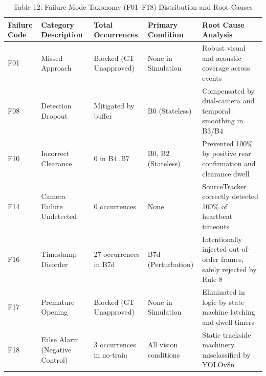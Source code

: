 \begin{table}[t]
\centering
\caption{Table 12: Failure Mode Taxonomy (F01–F18) Distribution and Root Causes}
\label{tab:table12_failure_analysis_taxonomy}
\begin{tabular}{lllll}
\hline
Failure Code & Category Description & Total Occurrences & Primary Condition & Root Cause Analysis \\
\hline
F01 & Missed Approach & Blocked (GT Unapproved) & None in Simulation & Robust visual and acoustic coverage across events \\
F08 & Detection Dropout & Mitigated by buffer & B0 (Stateless) & Compensated by dual-camera and temporal smoothing in B3/B4 \\
F10 & Incorrect Clearance & 0 in B4..B7 & B0, B2 (Stateless) & Prevented 100\% by positive rear confirmation and clearance dwell \\
F14 & Camera Failure Undetected & 0 occurrences & None & SourceTracker correctly detected 100\% of heartbeat timeouts \\
F16 & Timestamp Disorder & 27 occurrences in B7d & B7d (Perturbation) & Intentionally injected out-of-order frames, safely rejected by Rule 8 \\
F17 & Premature Opening & Blocked (GT Unapproved) & None in Simulation & Eliminated in logic by state machine latching and dwell timers \\
F18 & False Alarm (Negative Control) & 3 occurrences in no-train & All vision conditions & Static trackside machinery misclassified by YOLOv8n \\
\hline
\end{tabular}
\end{table}
